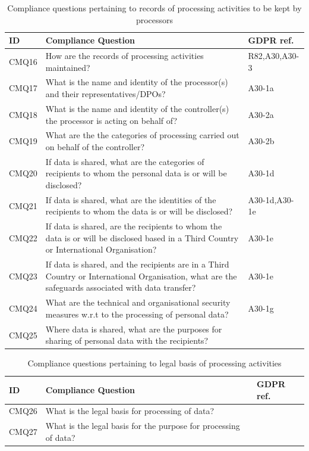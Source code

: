 \begin{table}
\small
\centering
\caption{Compliance questions pertaining to records of processing activities to be kept by processors}\label{table:info:compliance-processors}
\begin{tabularx}{\textwidth}{|l|X|l|}
\hline
\textbf{ID} & \textbf{Compliance Question} & \textbf{GDPR ref.} \\ \hline
CMQ16 & How are the records of processing activities maintained? & R82,A30,A30-3 \\ \hline
CMQ17 & What is the name and identity of the processor(s) and their representatives/DPOs? & A30-1a \\ \hline
CMQ18 & What is the name and identity of the controller(s) the processor is acting on behalf of? & A30-2a \\ \hline
CMQ19 & What are the the categories of processing carried out on behalf of the controller? & A30-2b \\ \hline
CMQ20 & If data is shared, what are the categories of recipients to whom the personal data is or will be disclosed? & A30-1d \\ \hline
CMQ21 & If data is shared, what are the identities of the recipients to whom the data is or will be disclosed? & A30-1d,A30-1e \\ \hline
CMQ22 & If data is shared, are the recipients to whom the data is or will be disclosed based in a Third Country or International Organisation? & A30-1e \\ \hline
CMQ23 & If data is shared, and the recipients are in a Third Country or International Organisation, what are the safeguards associated with data transfer? & A30-1e \\ \hline
CMQ24 & What are the technical and organisational security measures w.r.t to the processing of personal data? & A30-1g \\ \hline
CMQ25 & Where data is shared, what are the purposes for sharing of personal data with the recipients? &  \\ \hline
\end{tabularx}
\end{table}
\begin{table}
\small
\centering
\caption{Compliance questions pertaining to legal basis of processing activities}\label{table:info:compliance-legal-basis}
\begin{tabularx}{\textwidth}{|l|X|l|}
\hline
\textbf{ID} & \textbf{Compliance Question} & \textbf{GDPR ref.} \\ \hline
CMQ26 & What is the legal basis for processing of data? \\ \hline
CMQ27 & What is the legal basis for the purpose for processing of data? \\ \hline
\end{tabularx}
\end{table}
